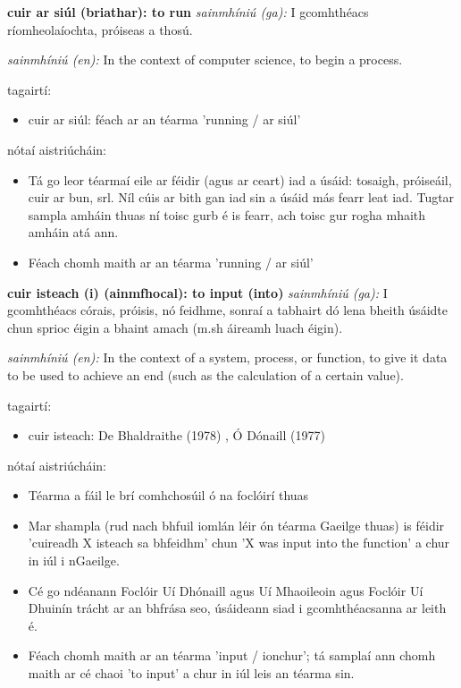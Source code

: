 \documentclass{article}
\begin{document}
\textbf{cuir ar siúl (briathar): to run}
\textit{sainmhíniú (ga):} I gcomhthéacs ríomheolaíochta, próiseas a thosú.

\textit{sainmhíniú (en):} In the context of computer science, to begin a process.

tagairtí:
\begin{itemize}
	\item cuir ar siúl: féach ar an téarma 'running / ar siúl'
\end{itemize}

nótaí aistriúcháin:
\begin{itemize}
	\item Tá go leor téarmaí eile ar féidir (agus ar ceart) iad a úsáid: tosaigh, próiseáil, cuir ar bun, srl. Níl cúis ar bith gan iad sin a úsáid más fearr leat iad. Tugtar sampla amháin thuas ní toisc gurb é is fearr, ach toisc gur rogha mhaith amháin atá ann.
	\item Féach chomh maith ar an téarma 'running / ar siúl'
\end{itemize}


\textbf{cuir isteach (i) (ainmfhocal): to input (into)}
\textit{sainmhíniú (ga):} I gcomhthéacs córais, próisis, nó feidhme, sonraí a tabhairt dó lena bheith úsáidte chun sprioc éigin a bhaint amach (m.sh áireamh luach éigin).

\textit{sainmhíniú (en):} In the context of a system, process, or function, to give it data to be used to achieve an end (such as the calculation of a certain value).

tagairtí:
\begin{itemize}
	\item cuir isteach: De Bhaldraithe (1978) \cite{de-bhaldraithe}, Ó Dónaill (1977) \cite{odonaill}
\end{itemize}

nótaí aistriúcháin:
\begin{itemize}
	\item Téarma a fáil le brí comhchosúil ó na foclóirí thuas
	\item Mar shampla (rud nach bhfuil iomlán léir ón téarma Gaeilge thuas) is féidir 'cuireadh X isteach sa bhfeidhm' chun 'X was input into the function' a chur in iúl i nGaeilge.
	\item Cé go ndéanann Foclóir Uí Dhónaill agus Uí Mhaoileoin agus Foclóir Uí Dhuinín trácht ar an bhfrása seo, úsáideann siad i gcomhthéacsanna ar leith é.
	\item Féach chomh maith ar an téarma 'input / ionchur'; tá samplaí ann chomh maith ar cé chaoi 'to input' a chur in iúl leis an téarma sin.
\end{itemize}
\end{document}
